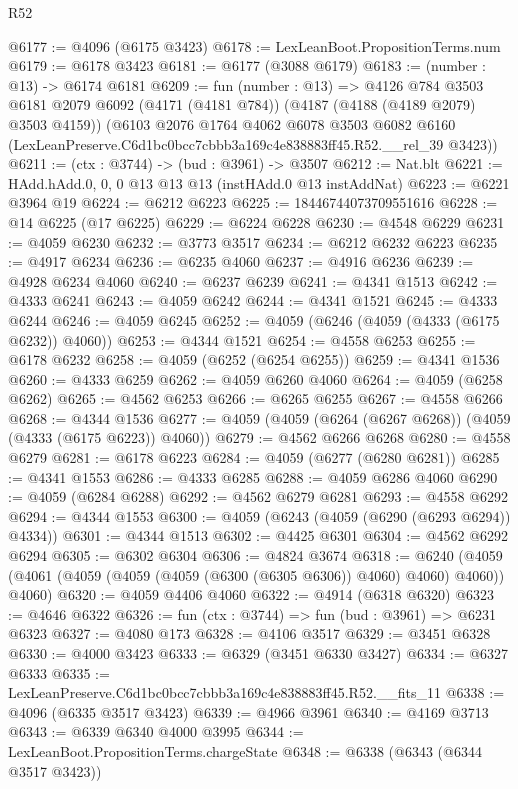 \begin{lexlean}{R52}
\begin{coremodule}
@6177 := @4096 (@6175 @3423)
@6178 := LexLeanBoot.PropositionTerms.num
@6179 := @6178 @3423
@6181 := @6177 (@3088 @6179)
@6183 := (number : @13) -> @6174 @6181
@6209 := fun (number : @13) =>
  @4126
    @784
    @3503
    @6181
    @2079
    @6092
    (@4171 (@4181 @784))
    (@4187 (@4188 (@4189 @2079) @3503 @4159))
    (@6103
      @2076
      @1764
      @4062
      @6078
      @3503
      @6082
      @6160
      (LexLeanPreserve.C6d1bc0bcc7cbbb3a169c4e838883ff45.R52.__rel_39 @3423))
@6211 := (ctx : @3744) -> (bud : @3961) -> @3507
@6212 := Nat.blt
@6221 := HAdd.hAdd.{0, 0, 0} @13 @13 @13 (instHAdd.{0} @13 instAddNat)
@6223 := @6221 @3964 @19
@6224 := @6212 @6223
@6225 := 18446744073709551616
@6228 := @14 @6225 (@17 @6225)
@6229 := @6224 @6228
@6230 := @4548 @6229
@6231 := @4059 @6230
@6232 := @3773 @3517
@6234 := @6212 @6232 @6223
@6235 := @4917 @6234
@6236 := @6235 @4060
@6237 := @4916 @6236
@6239 := @4928 @6234 @4060
@6240 := @6237 @6239
@6241 := @4341 @1513
@6242 := @4333 @6241
@6243 := @4059 @6242
@6244 := @4341 @1521
@6245 := @4333 @6244
@6246 := @4059 @6245
@6252 := @4059 (@6246 (@4059 (@4333 (@6175 @6232)) @4060))
@6253 := @4344 @1521
@6254 := @4558 @6253
@6255 := @6178 @6232
@6258 := @4059 (@6252 (@6254 @6255))
@6259 := @4341 @1536
@6260 := @4333 @6259
@6262 := @4059 @6260 @4060
@6264 := @4059 (@6258 @6262)
@6265 := @4562 @6253
@6266 := @6265 @6255
@6267 := @4558 @6266
@6268 := @4344 @1536
@6277 := @4059 (@4059 (@6264 (@6267 @6268)) (@4059 (@4333 (@6175 @6223)) @4060))
@6279 := @4562 @6266 @6268
@6280 := @4558 @6279
@6281 := @6178 @6223
@6284 := @4059 (@6277 (@6280 @6281))
@6285 := @4341 @1553
@6286 := @4333 @6285
@6288 := @4059 @6286 @4060
@6290 := @4059 (@6284 @6288)
@6292 := @4562 @6279 @6281
@6293 := @4558 @6292
@6294 := @4344 @1553
@6300 := @4059 (@6243 (@4059 (@6290 (@6293 @6294)) @4334))
@6301 := @4344 @1513
@6302 := @4425 @6301
@6304 := @4562 @6292 @6294
@6305 := @6302 @6304
@6306 := @4824 @3674
@6318 := @6240 (@4059 (@4061 (@4059 (@4059 (@4059 (@6300 (@6305 @6306)) @4060) @4060) @4060)) @4060)
@6320 := @4059 @4406 @4060
@6322 := @4914 (@6318 @6320)
@6323 := @4646 @6322
@6326 := fun (ctx : @3744) => fun (bud : @3961) => @6231 @6323
@6327 := @4080 @173
@6328 := @4106 @3517
@6329 := @3451 @6328
@6330 := @4000 @3423
@6333 := @6329 (@3451 @6330 @3427)
@6334 := @6327 @6333
@6335 := LexLeanPreserve.C6d1bc0bcc7cbbb3a169c4e838883ff45.R52.__fits_11
@6338 := @4096 (@6335 @3517 @3423)
@6339 := @4966 @3961
@6340 := @4169 @3713
@6343 := @6339 @6340 @4000 @3995
@6344 := LexLeanBoot.PropositionTerms.chargeState
@6348 := @6338 (@6343 (@6344 @3517 @3423))

\end{coremodule}
\end{lexlean}
